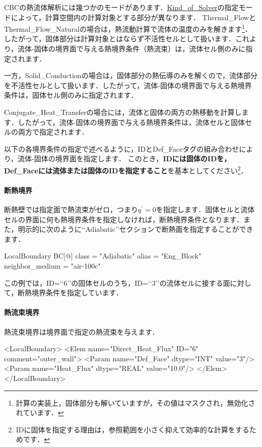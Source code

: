 CBCの熱流体解析には幾つかのモードがあります．\hyperlink{tgt:solver_property}{Kind\_of\_Solver}の指定モードによって，計算空間内の計算対象とする部分が異なります．
Thermal\_FlowとThermal\_Flow\_Naturalの場合は，熱流動計算で流体の温度のみを解きます\footnote{計算の実装上，固体部分も解いていますが，その値はマスクされ，無効化されています．}．したがって，固体部分は計算対象とはならず不活性セルとして扱います．これより，流体-固体の境界面で与える熱境界条件（熱流束）は，流体セル側のみに指定されます．

一方，Solid\_Conductionの場合は，固体部分の熱伝導のみを解くので，流体部分を不活性セルとして扱います．したがって，流体-固体の境界面で与える熱境界条件は，固体セル側のみに指定されます．

Conjugate\_Heat\_Transferの場合には，流体と固体の両方の熱移動を計算します．したがって，流体-固体の境界面で与える熱境界条件は，流体セルと固体セルの両方で指定されます．

以下の各境界条件の指定で述べるように，IDとDef\_Faceタグの組み合わせにより，流体-固体の境界面を指定します．
このとき，\textbf{IDには固体のIDを，Def\_Faceには流体または固体のIDを指定すること}を基本としてください\footnote{IDに固体を指定する理由は，参照範囲を小さく抑えて効率的な計算をするためです．}．

%
\paragraph{断熱境界}
断熱壁では指定面で熱流束がゼロ，つまり$q^{\prime}=0$を指定します．固体セルと流体セルの界面に何も熱境界条件を指定しなければ，断熱境界条件となります．また，明示的に次のように\lq\lq Adiabatic\rq\rq セクションで断熱面を指定することができます．

{\small
\begin{program}
LocalBoundary {
    BC[@] {
      class                    = "Adiabatic"
      alias                    = "Eng_Block"
      neighbor_medium          = "air-100c"
    }
}
\end{program}
}
この例では，ID=\lq\lq 6\rq\rq の固体セルのうち，ID=\lq\lq 3\rq\rq の流体セルに接する面に対して，断熱境界条件を指定しています．

%
\paragraph{熱流束境界}
熱流束境界は境界面で指定の熱流束を与えます．

{\small
\begin{program}
<LocalBoundary>
  <Elem name="Direct_Heat_Flux" ID="6" comment="outer_wall">
    <Param name="Def_Face"    dtype="INT"    value="3"/>
    <Param name="Heat_Flux"   dtype="REAL"   value="10.0"/>
  </Elem>
</LocalBoundary>
\end{program}
}

